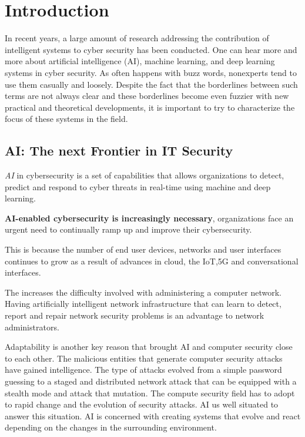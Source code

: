 
\chapter{Introduction} \label{ch-1}

In recent years, a large amount of research addressing the contribution of intelligent
systems to cyber security has been conducted. One can hear more and more about artificial intelligence (AI), machine learning, and deep learning systems in cyber security.
As often happens with buzz words, nonexperts tend to use them casually and loosely.
Despite the fact that the borderlines between such terms are not always clear and these
borderlines become even fuzzier with new practical and theoretical developments, it is
important to try to characterize the focus of these systems in the field.


\section{AI: The next Frontier in IT Security} 

\textit{AI} in cybersecurity is a set of capabilities that allows organizations to detect, predict and respond to cyber threats in real-time
using machine and deep learning.


\textbf{AI-enabled cybersecurity is increasingly necessary}, organizations face an urgent need to continually ramp up and improve their cybersecurity. 

This is because the number of end user devices, networks and user interfaces continues to grow as a result of advances in cloud, the IoT,5G and conversational interfaces.

The increases the difficulty involved with administering a computer network. Having artificially intelligent network infrastructure that can learn to detect,
report and repair network security problems is an advantage to network administrators. 

Adaptability is another key reason that brought AI and computer security close to each other. The malicious entities that generate computer security attacks have gained intelligence. 
The type of attacks evolved from a simple password guessing to a staged and distributed network attack that can be equipped with a stealth mode and attack that mutation.
The compute security field has to adopt to rapid change and the evolution of security attacks. AI us well situated to answer this situation. AI is concerned with creating systems that evolve
and react depending on the changes in the surrounding environment. 

